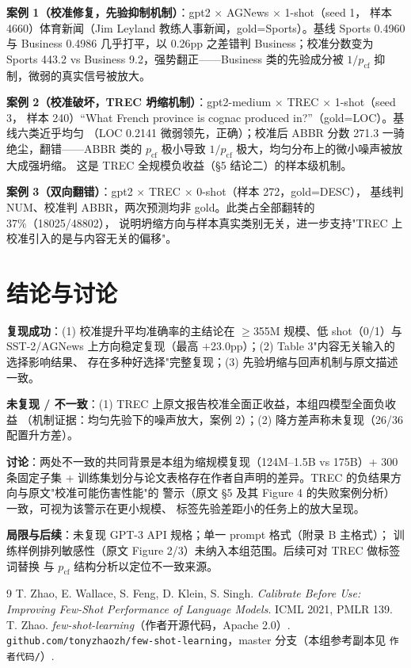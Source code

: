 \documentclass[11pt,a4paper]{ctexart}
\begin{document}
\textbf{案例 1（校准修复，先验抑制机制）}：gpt2 $\times$ AGNews $\times$ 1-shot（seed 1，
样本 4660）体育新闻（Jim Leyland 教练人事新闻，gold=Sports）。基线 Sports 0.4960 与
Business 0.4986 几乎打平，以 0.26pp 之差错判 Business；校准分数变为 Sports 443.2 vs
Business 9.2，强势翻正——Business 类的先验成分被 $1/p_{\mathrm{cf}}$ 抑制，微弱的真实信号被放大。

\textbf{案例 2（校准破坏，TREC 坍缩机制）}：gpt2-medium $\times$ TREC $\times$ 1-shot（seed 3，
样本 240）``What French province is cognac produced in?''（gold=LOC）。基线六类近乎均匀
（LOC 0.2141 微弱领先，正确）；校准后 ABBR 分数 271.3 一骑绝尘，翻错——ABBR 类的
$p_{\mathrm{cf}}$ 极小导致 $1/p_{\mathrm{cf}}$ 极大，均匀分布上的微小噪声被放大成强坍缩。
这是 TREC 全规模负收益（\S5 结论二）的样本级机制。

\textbf{案例 3（双向翻错）}：gpt2 $\times$ TREC $\times$ 0-shot（样本 272，gold=DESC），
基线判 NUM、校准判 ABBR，两次预测均非 gold。此类占全部翻转的 37\%（18025/48802），
说明坍缩方向与样本真实类别无关，进一步支持"TREC 上校准引入的是与内容无关的偏移"。

\section{结论与讨论}

\textbf{复现成功}：(1) 校准提升平均准确率的主结论在 $\geq$355M 规模、低 shot（0/1）与
SST-2/AGNews 上方向稳定复现（最高 $+$23.0pp）；(2) Table 3"内容无关输入的选择影响结果、
存在多种好选择"完整复现；(3) 先验坍缩与回声机制与原文描述一致。

\textbf{未复现 / 不一致}：(1) TREC 上原文报告校准全面正收益，本组四模型全面负收益
（机制证据：均匀先验下的噪声放大，案例 2）；(2) 降方差声称未复现（26/36 配置升方差）。

\textbf{讨论}：两处不一致的共同背景是本组为缩规模复现（124M--1.5B vs 175B）+ 300 条固定子集
+ 训练集划分与论文表格存在作者自声明的差异。TREC 的负结果方向与原文"校准可能伤害性能"的
警示（原文 \S5 及其 Figure 4 的失败案例分析）一致，可视为该警示在更小规模、
标签先验差距小的任务上的放大呈现。

\textbf{局限与后续}：未复现 GPT-3 API 规格；单一 prompt 格式（附录 B 主格式）；
训练样例排列敏感性（原文 Figure 2/3）未纳入本组范围。后续可对 TREC 做标签词替换
与 $p_{\mathrm{cf}}$ 结构分析以定位不一致来源。

\begin{thebibliography}{9}\small
{} T. Zhao, E. Wallace, S. Feng, D. Klein, S. Singh.
  \emph{Calibrate Before Use: Improving Few-Shot Performance of Language Models}.
  ICML 2021, PMLR 139.
 T. Zhao. \emph{few-shot-learning}（作者开源代码，Apache 2.0）.
  \texttt{github.com/tonyzhaozh/few-shot-learning}，master 分支（本组参考副本见 \texttt{作者代码/}）.
\end{thebibliography}
\end{document}
